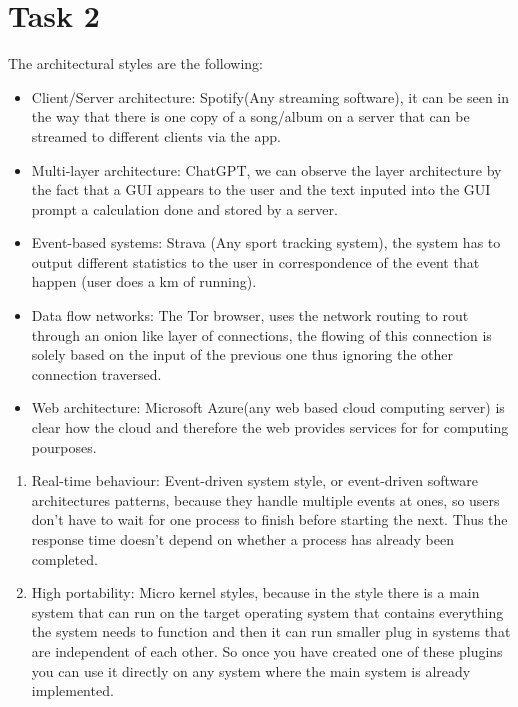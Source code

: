 \chapter{Task 2}
\begin{parlist}
	\item The architectural styles are the following:
	\begin{itemize}
		\item Client/Server architecture: Spotify(Any streaming software), it can be seen in the way that there is one copy of a song/album on a server that can be streamed to different clients via the app.
		\item Multi-layer architecture: ChatGPT, we can observe the layer architecture by the fact that a GUI appears to the user and the text inputed into the GUI prompt a calculation done and stored by a server.
		\item Event-based systems: Strava (Any sport tracking system), the system has to output different statistics to the user in correspondence of the event that happen (user does a km of running).
		\item Data flow networks: The Tor browser, uses the network routing to rout through an onion like layer of connections, the flowing of this connection is solely based on the input of the previous one thus ignoring the other connection traversed. 
		\item Web architecture: Microsoft Azure(any web based cloud computing server) is clear how the cloud and therefore the web provides services for for computing pourposes.
	\end{itemize}
	\item 
	\begin{enumerate}
		\item Real-time behaviour: Event-driven system style, or event-driven software architectures patterns, because they handle multiple events at ones, so users don't have to wait for one process to finish before starting the next. Thus the response time doesn't depend on whether a process has already been completed.\cite{infoworldBenefitsChallenges}
		\item High portability: Micro kernel styles, because in the style there is a main system that can run on the target operating system that contains everything the system needs to function and then it can run smaller plug in systems that are independent of each other. So once you have created one of these plugins you can use it directly on any system where the main system is already implemented.\cite{spiritofsoftSoftwareArchitecture}
	\end{enumerate}
\end{parlist}